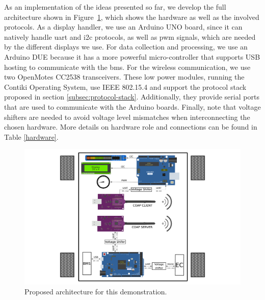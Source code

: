 \documentclass[runningheads]{llncs}
\begin{document}
As an implementation of the ideas presented so far, we develop the
full architecture shown in Figure~\ref{full_architecture}, which shows the
hardware as well as the involved protocols.
As a display handler, we use an Arduino UNO board, since it can natively handle \gls{uart} and \gls{i2c} protocols, as well as \gls{pwm} signals, which are needed by the different displays we use.
For data collection and processing, we use an Arduino DUE because it has a 
more powerful micro-controller that supports USB hosting to communicate with the
\gls{bms}.
For the wireless communication, we use two OpenMotes CC2538 transceivers.
These low power modules, running the Contiki Operating System, use IEEE
802.15.4 and support the protocol stack proposed in section
\ref{subsec:protocol-stack}.
Additionally, they provide serial ports that are used to communicate with the Arduino boards.
Finally, note that voltage shifters are needed to avoid voltage level mismatches when interconnecting the chosen hardware.
More details on hardware role and connections can be found in Table
\ref{hardware}. 


\begin{figure}[!t]
\includegraphics[width=\textwidth] {proposed_architecture.pdf}

\caption{Proposed architecture for this demonstration.} \label{full_architecture}
\end{figure}
\end{document}
